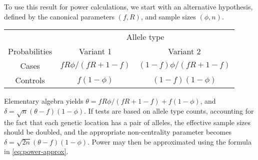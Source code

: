 To use this result for power calculations, we start with an alternative hypothesis, defined by the canonical parameters $(f, R)$, and sample sizes $(\phi, n)$.
\begin{center}
    \begin{tabular}{ccc}
    \hline
    & \multicolumn{2}{c}{Allele type} \\
    \cline{2-3}
    Probabilities & Variant 1 & Variant 2 \\
    \hline
    Cases & ${fR\phi}/{(fR+1-f)}$ & ${(1-f)\phi}/{(fR+1-f)}$ \\
    Controls & $f(1-\phi)$ & $(1-f)(1-\phi)$ \\
    \hline
    \end{tabular}
\end{center}
Elementary algebra yields $\theta = {fR\phi}/{(fR+1-f)} + f(1-\phi)$, and $\delta = \sqrt{n}(\theta - f)(1-\phi)$.
If tests are based on allele type counts, accounting for the fact that each genetic location has a pair of alleles, the effective sample sizes should be doubled, and the appropriate non-centrality parameter becomes  $\delta = \sqrt{2n}(\theta - f)(1-\phi)$.
Power may then be approximated using the formula in \eqref{eq:power-approx}.


